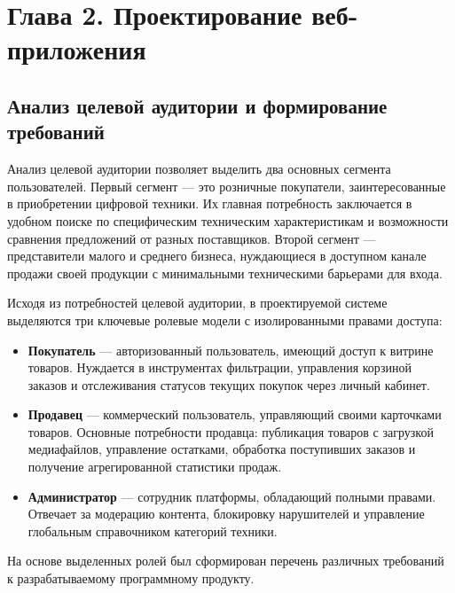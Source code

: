 \section*{Глава 2. Проектирование веб-приложения}


\subsection{Анализ целевой аудитории и формирование требований}

Анализ целевой аудитории позволяет выделить два основных сегмента пользователей. Первый сегмент — это розничные покупатели, 
заинтересованные в приобретении цифровой техники. Их главная потребность заключается в удобном поиске по специфическим техническим 
характеристикам и возможности сравнения предложений от разных поставщиков. Второй сегмент — представители малого и среднего 
бизнеса, нуждающиеся в доступном канале продажи своей продукции с минимальными техническими барьерами для входа.

Исходя из потребностей целевой аудитории, в проектируемой системе выделяются три ключевые ролевые модели с изолированными правами доступа:

\begin{itemize}
	\item \textbf{Покупатель} --- авторизованный пользователь, имеющий доступ к витрине товаров. Нуждается в инструментах фильтрации, 
			управления корзиной заказов и отслеживания статусов текущих покупок через личный кабинет.
	\item \textbf{Продавец} --- коммерческий пользователь, управляющий своими карточками товаров. Основные потребности продавца: публикация товаров 
			с загрузкой медиафайлов, управление остатками, обработка поступивших заказов и получение агрегированной статистики продаж.
	\item \textbf{Администратор} --- сотрудник платформы, обладающий полными правами. Отвечает за модерацию контента, блокировку нарушителей 
			и управление глобальным справочником категорий техники.
\end{itemize}

На основе выделенных ролей был сформирован перечень различных требований к разрабатываемому программному продукту.

